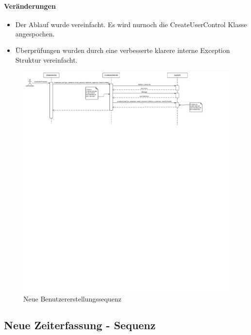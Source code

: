 \paragraph{Veränderungen}
\begin{itemize}
    \item Der Ablauf wurde vereinfacht. Es wird nurnoch die CreateUserControl Klasse angespochen.
    \item Überprüfungen wurden durch eine verbesserte klarere interne Exception Struktur vereinfacht.
\end{itemize}

\begin{figure}
  \centering
    \includegraphics[width=\linewidth]{Create-user-account-new.svg}
   \caption{Neue Benutzererstellungssequenz}
\end{figure}

\subsection{Neue Zeiterfassung - Sequenz}

